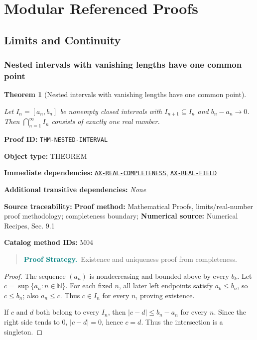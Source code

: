 \documentclass[10pt]{article}
\newcommand{\pidraw}[1]{\begingroup\urlstyle{tt}\nolinkurl{#1}\endgroup}
\newcommand{\pidref}[1]{\hyperref[prf:#1]{\pidraw{#1}}}
\newtheorem{theorem}{Theorem}[section]
\theoremstyle{definition}
\theoremstyle{remark}
\newenvironment{proofstrategy}
{\begin{quote}\small\noindent\textbf{\textcolor{teal}{Proof Strategy.}}\ }
{\end{quote}}
\newcommand{\meta}[2]{\noindent\textbf{#1:} #2\par}
\begin{document}
\section{Modular Referenced Proofs}

\subsection{Limits and Continuity}

\subsubsection{Nested intervals with vanishing lengths have one common point}

\begin{theorem}[Nested intervals with vanishing lengths have one common point]\label{prf:THM-NESTED-INTERVAL}

Let $I_n=[a_n,b_n]$ be nonempty closed intervals with
$I_{n+1}\subseteq I_n$ and $b_n-a_n\to0$. Then
$\bigcap_{n=1}^\infty I_n$ consists of exactly one real number.

\end{theorem}

\meta{Proof ID}{\pidraw{THM-NESTED-INTERVAL}}
\meta{Object type}{THEOREM}
\meta{Immediate dependencies}{\pidref{AX-REAL-COMPLETENESS}, \pidref{AX-REAL-FIELD}}
\meta{Additional transitive dependencies}{\emph{None}}
\meta{Source traceability}{\textbf{Proof method:} Mathematical Proofs, limits/real-number proof methodology; completeness boundary; \textbf{Numerical source:} Numerical Recipes, Sec. 9.1}
\meta{Catalog method IDs}{M04}

\begin{proofstrategy}Existence and uniqueness proof from completeness.\end{proofstrategy}

\begin{proof}

The sequence $(a_n)$ is nondecreasing and bounded above by every $b_k$.
Let $c=\sup\{a_n:n\in\mathbb N\}$. For each fixed $n$, all later left
endpoints satisfy $a_k\le b_n$, so $c\le b_n$; also $a_n\le c$. Thus
$c\in I_n$ for every $n$, proving existence.

If $c$ and $d$ both belong to every $I_n$, then
$|c-d|\le b_n-a_n$ for every $n$. Since the right side tends to $0$,
$|c-d|=0$, hence $c=d$. Thus the intersection is a singleton.

\end{proof}
\end{document}
